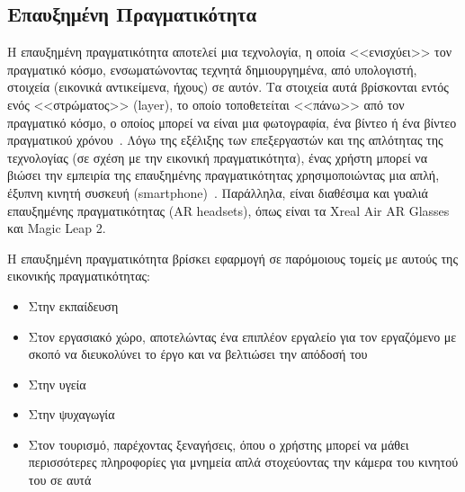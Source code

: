 \subsection{Επαυξημένη Πραγματικότητα}\label{subsec:augmentedReality}
Η επαυξημένη πραγματικότητα αποτελεί μια τεχνολογία, η οποία <<ενισχύει>> τον πραγματικό κόσμο, ενσωματώνοντας τεχνητά δημιουργημένα, από υπολογιστή, στοιχεία (εικονικά αντικείμενα, ήχους) σε αυτόν. Τα στοιχεία αυτά βρίσκονται εντός ενός <<στρώματος>> (layer), το οποίο τοποθετείται <<πάνω>> από τον πραγματικό κόσμο, ο οποίος μπορεί να είναι μια φωτογραφία, ένα βίντεο ή ένα βίντεο πραγματικού χρόνου~\cite{hosch_2020_augmented,carmigniani_2011_augmented}. Λόγω της εξέλιξης των επεξεργαστών και της απλότητας της τεχνολογίας (σε σχέση με την εικονική πραγματικότητα), ένας χρήστη μπορεί να βιώσει την εμπειρία της επαυξημένης πραγματικότητας χρησιμοποιώντας μια απλή, έξυπνη κινητή συσκευή (smartphone)~\cite{ko_2013_usability}. Παράλληλα, είναι διαθέσιμα και γυαλιά επαυξημένης πραγματικότητας (AR headsets), όπως είναι τα Xreal Air AR Glasses και Magic Leap 2.

Η επαυξημένη πραγματικότητα βρίσκει εφαρμογή σε παρόμοιους τομείς με αυτούς της εικονικής πραγματικότητας:
\begin{itemize}
    \item Στην εκπαίδευση~\cite{wu_2013_current,lee_2012_augmented}
    \item Στον εργασιακό χώρο, αποτελώντας ένα επιπλέον εργαλείο για τον εργαζόμενο με σκοπό να διευκολύνει το έργο και να βελτιώσει την απόδοσή του~\cite{kim_2016_augmented,funk_2017_working,pereira_2023_augmented}
    \item Στην υγεία~\cite{klinker_2019_digital,zhu_2015_design,gerup_2020_augmented,solbiati_2020_augmented}
    \item Στην ψυχαγωγία~\cite{hung_2021_a}
    \item Στον τουρισμό, παρέχοντας ξεναγήσεις, όπου ο χρήστης μπορεί να μάθει περισσότερες πληροφορίες για μνημεία απλά στοχεύοντας την κάμερα του κινητού του σε αυτά~\cite{yovcheva_2012_smartphone,kounavis_2012_enhancing}
\end{itemize} 

